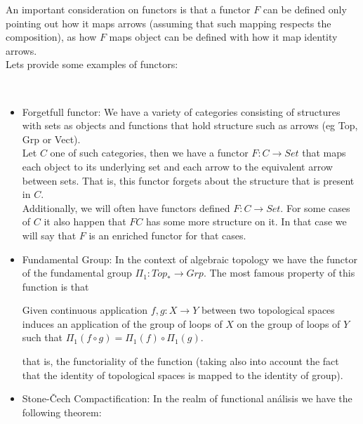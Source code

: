 An  important consideration on functors is that a functor $F$ can be defined only pointing out how it maps arrows (assuming that such mapping respects the composition), as how $F$ maps object can be defined with how it map identity arrows.\\

Lets provide some examples of functors:\\



\begin{example}\ 
  \begin{itemize}
  \item {Forgetfull functor}: We have a variety of categories consisting of structures with sets as objects and functions that hold structure such as arrows (eg Top, Grp or Vect).\\
    
    Let $C$ one of such  categories, then we have a functor $F:C\to Set$ that maps each object to its underlying set and each arrow to the equivalent arrow between sets. That is, this functor forgets about the structure that is present in $C$.\\

    Additionally, we will often have functors defined $F:C\to Set$. For some cases of $C$ it also happen that $FC$ has some more structure on it. In that case we will say that $F$ is an enriched functor for that cases.

  \item Fundamental Group: In the context of algebraic topology we have the functor of the fundamental group $\Pi_1: Top_* \to Grp$. The most famous property of this function is that

    
    \begin{displayquote}
      Given continuous application $ f,g:X \to Y$ between two topological spaces induces an application of the group of loops of $X$ on the group of loops of $Y$ such that $\Pi_1(f \circ g) = \Pi_1(f) \circ \Pi_1(g)$.
    \end{displayquote}

    that is, the functoriality of the function (taking also into account the fact that the identity of topological spaces is mapped to the identity of group). 

  \item Stone-\v{C}ech Compactification:  In the realm of functional análisis we have the following theorem:


\end{itemize}
\end{example}
